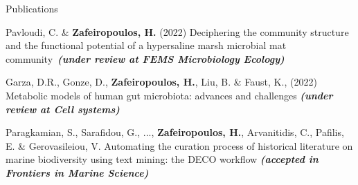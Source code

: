 \documentclass{beamer}
\begin{document}
\begin{frame}[label=bibliography]{Publications}
\begin{thebibliography}{9}
         \tiny	
            Pavloudi, C. \& \textbf{Zafeiropoulos, H.} (2022) Deciphering the community structure and the functional potential of a hypersaline marsh microbial mat community~\textbf{\textit{(under review at FEMS Microbiology Ecology)}}

         \tiny
            Garza, D.R., Gonze, D., \textbf{Zafeiropoulos, H.}, Liu, B. \& Faust, K., (2022) Metabolic models of human gut microbiota: advances and challenges \textbf{\textit{(under review at Cell systems)}} 

         \tiny 
         Paragkamian, S., Sarafidou, G., ..., \textbf{Zafeiropoulos, H.}, Arvanitidis, C., Pafilis, E. \& Gerovasileiou, V. 
         Automating the curation process of historical literature on marine biodiversity using text mining: the DECO workflow \textbf{\textit{(accepted in Frontiers in Marine Science)}}


      \end{thebibliography}

   \end{frame}

\end{document}
